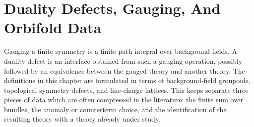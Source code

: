 \chapter{Duality Defects, Gauging, And Orbifold Data}
\label{ch:global-duality-defects-gauging-orbifold-data}

\ConventionsMixed

Gauging a finite symmetry is a finite path integral over background fields.
A duality defect is an interface obtained from such a gauging operation,
possibly followed by an equivalence between the gauged theory and another
theory.  The definitions in this chapter are formulated in terms of
background-field groupoids, topological symmetry defects, and line-charge
lattices.  This keeps separate three pieces of data which are often
compressed in the literature: the finite sum over bundles, the anomaly or
counterterm choice, and the identification of the resulting theory with a
theory already under study.

